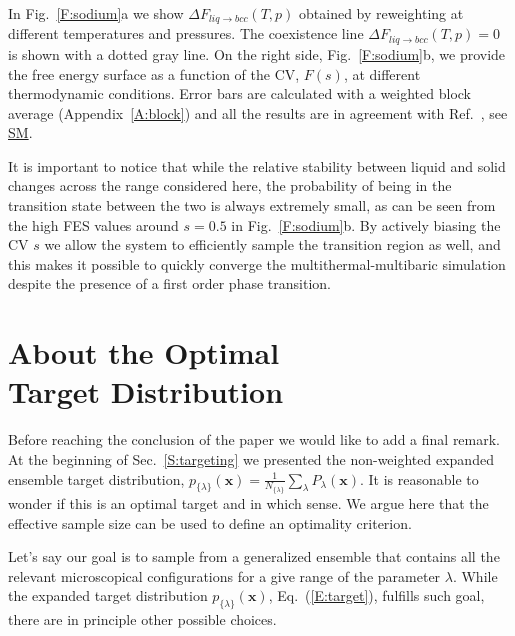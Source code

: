 \documentclass[aps,prx,reprint,superscriptaddress]{revtex4-1} %
\begin{document}
In Fig.~\ref{F:sodium}a we show $\Delta F_{liq \rightarrow bcc}(T,p)$ obtained by reweighting at different temperatures and pressures. 
The coexistence line $\Delta F_{liq \rightarrow bcc}(T,p)=0$ is shown with a dotted gray line.
On the right side, Fig.~\ref{F:sodium}b, we provide the free energy surface as a function of the CV, $F(s)$, at different thermodynamic conditions.
Error bars are calculated with a weighted block average (Appendix~\ref{A:block}) and all the results are in agreement with Ref.~, see \href{https://arxiv.org/src/2007.03055v3/anc/SupplementalMaterial.pdf}{SM}.

It is important to notice that while the relative stability between liquid and solid changes across the range considered here, the probability of being in the transition state between the two is always extremely small, as can be seen from the high FES values around $s=0.5$ in Fig.~\ref{F:sodium}b.
By actively biasing the CV $s$ we allow the system to efficiently sample the transition region as well, and this makes it possible to quickly converge the multithermal-multibaric simulation despite the presence of a first order phase transition.

\section{About the Optimal\\Target Distribution\label{S:optimal}}
Before reaching the conclusion of the paper we would like to add a final remark.
At the beginning of Sec.~\ref{S:targeting} we presented the non-weighted expanded ensemble target distribution, $p_{\{\lambda\}}(\mathbf{x})=\frac{1}{N_{\{\lambda\}}}\sum_\lambda P_\lambda(\mathbf{x})$.
It is reasonable to wonder if this is an optimal target and in which sense.
We argue here that the effective sample size can be used to define an optimality criterion.

Let's say our goal is to sample from a generalized ensemble that contains all the relevant microscopical configurations for a give range of the parameter $\lambda$.
While the expanded target distribution $p_{\{\lambda\}}(\mathbf{x})$, Eq.~(\ref{E:target}), fulfills such goal, there are in principle other possible choices.
\end{document}
